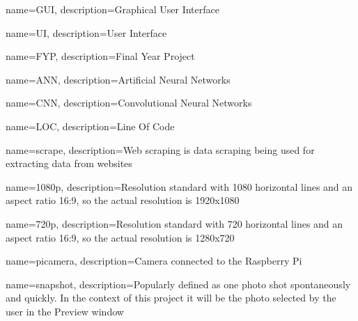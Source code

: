 {
        name=GUI,
        description={Graphical User Interface}
}

{
        name=UI,
        description={User Interface}
}

{
        name=FYP,
        description={Final Year Project}
}

{
        name=ANN,
        description={Artificial Neural Networks}
}

{
        name=CNN,
        description={Convolutional Neural Networks}
}

{
        name=LOC,
        description={Line Of Code}
}

{
        name=scrape,
        description={Web scraping is data scraping being used for extracting data from websites}
}

{
        name=1080p,
        description={Resolution standard with 1080 horizontal lines and an aspect ratio 16:9, so the actual resolution is 1920x1080}
}

{
        name=720p,
        description={Resolution standard with 720 horizontal lines and an aspect ratio 16:9, so the actual resolution is 1280x720}
}

{
        name=picamera,
        description={Camera connected to the Raspberry Pi}
}

{
        name=snapshot,
        description={Popularly defined as one photo shot spontaneously and quickly. In the context of this project it will be the photo selected by the user in the Preview window}
}

% 
